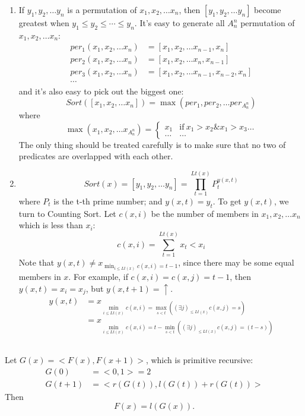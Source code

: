 \begin{enumerate}
  \item
  If $ y_{1},y_{2},\dots y_{n} $ is a permutation of $ x_{1},x_{2},\dots x_{n} $,
  then $ [y_{1},y_{2},\dots y_{n}] $ become greatest when $ y_{1}\le y_{2}\le \cdots \le y_{n} $.
  It's easy to generate all $A_n^n$ permutation of $ x_{1},x_{2},\dots x_{n} $:
  \begin{align*}
    per_1(x_{1},x_{2},\dots x_{n}) & = [x_{1},x_{2},\dots x_{n-1},x_{n}] \\
    per_2(x_{1},x_{2},\dots x_{n}) & = [x_{1},x_{2},\dots x_{n},x_{n-1}] \\
    per_3(x_{1},x_{2},\dots x_{n}) & = [x_{1},x_{2},\dots x_{n-1},x_{n-2},x_{n}] \\
    \cdots
  \end{align*}
  and it's also easy to pick out the biggest one:
  \[ Sort([x_{1},x_{2},\dots x_{n}]) = \max(per_{1},per_{2},\dots per_{A_n^n}) \]
  where
  \[ \max(x_{1},x_{2},\dots x_{A_n^n}) = 
     \begin{cases}
       x_{1} & \mathrm{if}\ x_{1}>x_{2}\& x_{1}>x_{3}\dots \\
       \dots & \dots 
     \end{cases} \]
  The only thing should be treated carefully is to make sure that no two of 
  predicates are overlapped with each other.

  \item 
  \[ Sort(x) = [y_{1},y_{2},\dots y_{n}] = \prod_{t=1}^{Lt(x)}P_t^{y(x,t)} \]
  where $P_t$ is the t-th prime number; and $y(x,t) = y_t$. To get $y(x,t)$, 
  we turn to Counting Sort. Let $c(x,i)$ be the number of members in
  $ x_{1},x_{2},\dots x_{n} $ which is less than $x_{i}$:
  \[ c(x,i) = \sum_{t=1}^{Lt(x)}x_t < x_i \]
  Note that $ y(x,t) \neq x_{\min_{i\le Lt(x)}c(x,i)=t-1} $, since there may 
  be some equal members in $x$. For example, if $ c(x,i) = c(x,j) = t-1 $, 
  then $ y(x,t) = x_{i} = x_{j} $, but $ y(x,t+1) = \uparrow $.
  \[\begin{split}
    y(x,t) & = x_{\min_{i\le Lt(x)} c(x,i) = \max_{s<t}((\exists j)_{\le Lt(x)}c(x,j)=s) }  \\
           & = x_{\min_{i\le Lt(x)} c(x,i) = t - \min_{s<t}((\exists j)_{\le Lt(x)}c(x,j)=(t-s)) }
  \end{split} \]
  
\end{enumerate}


\subsection{}
Let $ G(x) = <F(x), F(x+1)> $, which is primitive recursive:
\begin{align*}
  G(0)   & = <0,1> = 2 \\
  G(t+1) & = <r(G(t)),l(G(t))+r(G(t))>
\end{align*}
Then 
\[ F(x) = l(G(x)) .\]


